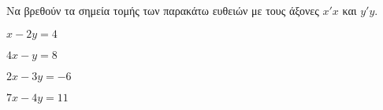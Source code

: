 Να βρεθούν τα σημεία τομής των παρακάτω ευθειών με τους άξονες $ x'x $ και $ y'y $.
\begin{multicols}{2}
\begin{rlist}[leftmargin=5mm]
\item $ x-2y=4 $
\item $ 4x-y=8 $
\item $ 2x-3y=-6 $
\item $ 7x-4y=11 $
\end{rlist}
\end{multicols}
